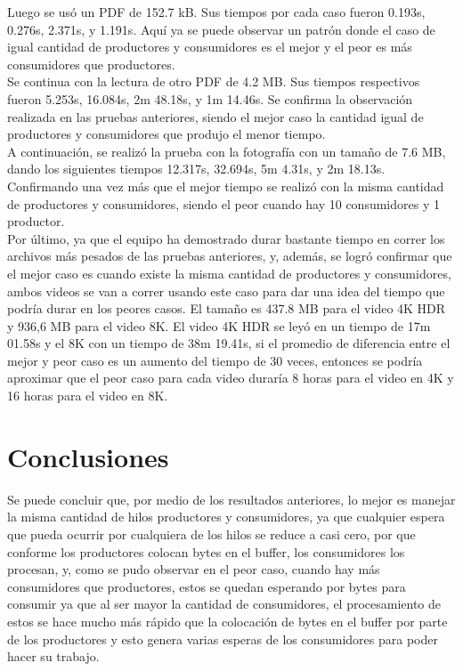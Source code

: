 \documentclass[12pt, article, natbib]{IEEEtran}
\begin{document}
Luego se usó un PDF de 152.7 kB. Sus tiempos por cada caso fueron 0.193s, 0.276s, 2.371s, y 1.191s. Aquí ya se puede observar un patrón donde el caso de igual cantidad de productores y consumidores es el mejor y el peor es más consumidores que productores.\\

Se continua con la lectura de otro PDF de 4.2 MB. Sus tiempos respectivos fueron 5.253s, 16.084s, 2m 48.18s, y 1m 14.46s. Se confirma la observación realizada en las pruebas anteriores, siendo el mejor caso la cantidad igual de productores y consumidores que produjo el menor tiempo.\\

A continuación, se realizó la prueba con la fotografía con un tamaño de 7.6 MB, dando los siguientes tiempos 12.317s, 32.694s, 5m 4.31s, y 2m 18.13s. Confirmando una vez más que el mejor tiempo se realizó con la misma cantidad de productores y consumidores, siendo el peor cuando hay 10 consumidores y 1 productor.\\

Por último, ya que el equipo ha demostrado durar bastante tiempo en correr los archivos más pesados de las pruebas anteriores, y, además, se logró confirmar que el mejor caso es cuando existe la misma cantidad de productores y consumidores, ambos videos se van a correr usando este caso para dar una idea del tiempo que podría durar en los peores casos. El tamaño es 437.8 MB para el video 4K HDR y 936,6 MB para el video 8K. El video 4K HDR se leyó en un tiempo de 17m 01.58s y el 8K con un tiempo de 38m 19.41s, si el promedio de diferencia entre el mejor y peor caso es un aumento del tiempo de 30 veces, entonces se podría aproximar que el peor caso para cada video duraría 8 horas para el video en 4K y 16 horas para el video en 8K.\\

\section{Conclusiones}
Se puede concluir que, por medio de los resultados anteriores, lo mejor es manejar la misma cantidad de hilos productores y consumidores, ya que cualquier espera que pueda ocurrir por cualquiera de los hilos se reduce a casi cero, por que conforme los productores colocan bytes en el buffer, los consumidores los procesan, y, como se pudo observar en el peor caso, cuando hay más consumidores que productores, estos se quedan esperando por bytes para consumir ya que al ser mayor la cantidad de consumidores, el procesamiento de estos se hace mucho más rápido que la colocación de bytes en el buffer por parte de los productores y esto genera varias esperas de los consumidores para poder hacer su trabajo.\\
\end{document}
